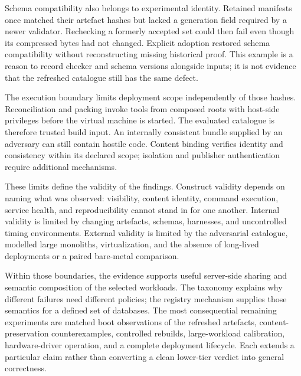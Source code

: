 Schema compatibility also belongs to experimental identity. Retained manifests once matched their artefact hashes but lacked a generation field required by a newer validator. Rechecking a formerly accepted set could then fail even though its compressed bytes had not changed. Explicit adoption restored schema compatibility without reconstructing missing historical proof. This example is a reason to record checker and schema versions alongside inputs; it is not evidence that the refreshed catalogue still has the same defect.

The execution boundary limits deployment scope independently of those hashes. Reconciliation and packing invoke tools from composed roots with host-side privileges before the virtual machine is started. The evaluated catalogue is therefore trusted build input. An internally consistent bundle supplied by an adversary can still contain hostile code. Content binding verifies identity and consistency within its declared scope; isolation and publisher authentication require additional mechanisms.

These limits define the validity of the findings. Construct validity depends on naming what was observed: visibility, content identity, command execution, service health, and reproducibility cannot stand in for one another. Internal validity is limited by changing artefacts, schemas, harnesses, and uncontrolled timing environments. External validity is limited by the adversarial catalogue, modelled large monoliths, virtualization, and the absence of long-lived deployments or a paired bare-metal comparison.

Within those boundaries, the evidence supports useful server-side sharing and semantic composition of the selected workloads. The taxonomy explains why different failures need different policies; the registry mechanism supplies those semantics for a defined set of databases. The most consequential remaining experiments are matched boot observations of the refreshed artefacts, content-preservation counterexamples, controlled rebuilds, large-workload calibration, hardware-driver operation, and a complete deployment lifecycle. Each extends a particular claim rather than converting a clean lower-tier verdict into general correctness.
